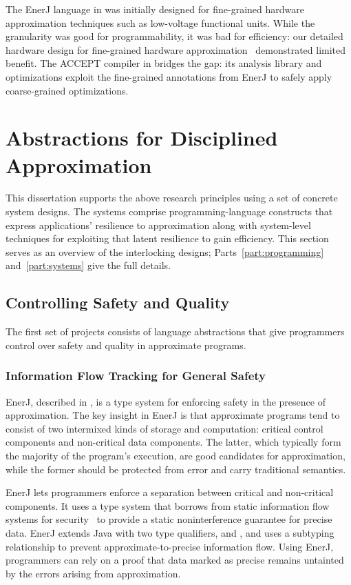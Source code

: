 The EnerJ language in  was initially designed for
fine-grained hardware approximation techniques such as low-voltage functional
units.
While the granularity was good for programmability, it was bad for efficiency:
our detailed hardware design for fine-grained hardware
approximation~\cite{truffle} demonstrated limited benefit.
The ACCEPT compiler in  bridges the gap: its analysis
library and optimizations exploit the fine-grained annotations from EnerJ to
safely apply coarse-grained optimizations.


\section{Abstractions for Disciplined Approximation}

This dissertation supports the above research principles using a set of
concrete system designs.
The systems comprise programming-language constructs that express
applications' resilience to approximation along with system-level
techniques for exploiting that latent resilience to gain efficiency.
This section serves as an overview of the interlocking designs;
Parts~\ref{part:programming} and~\ref{part:systems} give the full details.

\subsection{Controlling Safety and Quality}

The first set of projects consists of language abstractions that give
programmers control over safety and quality in approximate programs.

\subsubsection{Information Flow Tracking for General Safety}

EnerJ, described in , is a type system for enforcing safety in
the presence of approximation.
The key insight in EnerJ is that approximate programs tend to consist of two
intermixed kinds of storage and computation:
critical control components
and non-critical data components.
The latter, which typically form the majority of the program's execution,
are good candidates for approximation,
while the former should be protected from error and carry traditional
semantics.

EnerJ lets programmers enforce a separation between critical and non-critical
components.
It uses a type system that
borrows from static information
flow systems for security~\cite{jif, infflow-survey} to provide a static
noninterference guarantee for precise data.
EnerJ extends Java with two type qualifiers,  and
, and uses a subtyping relationship to prevent
approximate-to-precise information flow.
Using EnerJ, programmers can rely
on a proof that data marked as precise remains untainted by the errors arising
from approximation.

